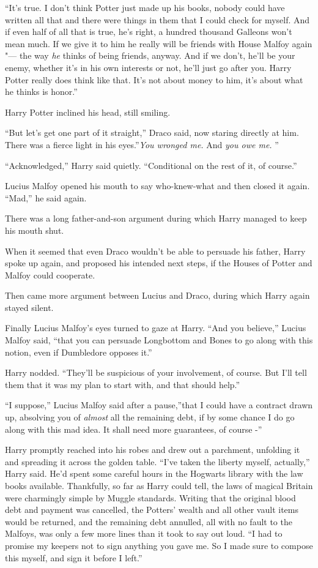 ``It's true. I don't think Potter just made up his books, nobody could
have written all that and there were things in them that I could check
for myself. And if even half of all that is true, he's right, a hundred
thousand Galleons won't mean much. If we give it to him he really will
be friends with House Malfoy again "--- the way \emph{he} thinks of being
friends, anyway. And if we don't, he'll be your enemy, whether it's in
his own interests or not, he'll just go after you. Harry Potter really
does think like that. It's not about money to him, it's about what he
thinks is honor.''

Harry Potter inclined his head, still smiling.

``But let's get one part of it straight,'' Draco said, now staring
directly at him. There was a fierce light in his eyes.''\emph{You
wronged me.} And \emph{you owe me.} ''

``Acknowledged,'' Harry said quietly. ``Conditional on the rest of it,
of course.''

Lucius Malfoy opened his mouth to say who-knew-what and then closed it
again. ``Mad,'' he said again.

There was a long father-and-son argument during which Harry managed to
keep his mouth shut.

When it seemed that even Draco wouldn't be able to persuade his father,
Harry spoke up again, and proposed his intended next steps, if the
Houses of Potter and Malfoy could cooperate.

Then came more argument between Lucius and Draco, during which Harry
again stayed silent.

Finally Lucius Malfoy's eyes turned to gaze at Harry. ``And you
believe,'' Lucius Malfoy said, ``that you can persuade Longbottom and
Bones to go along with this notion, even if Dumbledore opposes it.''

Harry nodded. ``They'll be suspicious of your involvement, of course.
But I'll tell them that it was my plan to start with, and that should
help.''

``I suppose,'' Lucius Malfoy said after a pause,''that I could have a
contract drawn up, absolving you of \emph{almost} all the remaining
debt, if by some chance I do go along with this mad idea. It shall need
more guarantees, of course -''

Harry promptly reached into his robes and drew out a parchment,
unfolding it and spreading it across the golden table. ``I've taken the
liberty myself, actually,'' Harry said. He'd spent some careful hours in
the Hogwarts library with the law books available. Thankfully, so far as
Harry could tell, the laws of magical Britain were charmingly simple by
Muggle standards. Writing that the original blood debt and payment was
cancelled, the Potters' wealth and all other vault items would be
returned, and the remaining debt annulled, all with no fault to the
Malfoys, was only a few more lines than it took to say out loud. ``I had
to promise my keepers not to sign anything you gave me. So I made sure
to compose this myself, and sign it before I left.''

